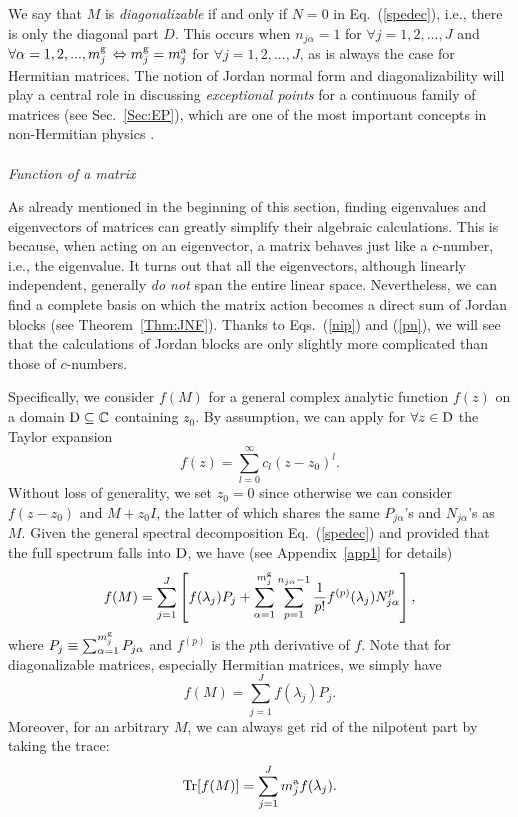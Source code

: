 \documentclass{tADP2e}
\theoremstyle{plain}
\theoremstyle{plain}
\theoremstyle{definition}
\begin{document}
We say that $M$ is \emph{diagonalizable} if and only if $N=0$ in Eq.~(\ref{spedec}), i.e., there is only the diagonal part $D$. This occurs when $n_{j\alpha}=1$ for $\forall j=1,2,...,J$ and $\forall\alpha=1,2,...,m^{\rm g}_j$ $\Leftrightarrow m^{\rm g}_j=m^{\rm a}_j$ for $\forall j=1,2,...,J$, as is always the case for Hermitian matrices. 
The notion of Jordan normal form and diagonalizability will play a central role in discussing \emph{exceptional points} \cite{TK80} for a continuous family of matrices (see Sec.~\ref{Sec:EP}), which are one of the most important concepts in non-Hermitian physics \cite{WDH12}. 
\\
\\
{\it Function of a matrix}

\vspace{3pt}
\noindent
As already mentioned in the beginning of this section, finding eigenvalues and eigenvectors of matrices can greatly simplify their algebraic calculations. This is because, when acting on an eigenvector, a matrix behaves just like a $c$-number, i.e., the eigenvalue. It turns out that all the eigenvectors, although linearly independent, generally \emph{do not} span the entire linear space. Nevertheless, we can find a complete basis on which the matrix action becomes a direct sum of Jordan blocks (see Theorem~\ref{Thm:JNF}). Thanks to Eqs.~(\ref{nip}) and (\ref{pn}), we will see that the calculations of Jordan blocks are only slightly more complicated than those of $c$-numbers.  

Specifically, we consider $f(M)$ for a general complex analytic function $f(z)$ on a domain ${\rm D}\subseteq\mathbb{C}$ containing $z_0$. By assumption, we can apply for $\forall z\in{\rm D}$ the Taylor expansion \cite{LVA79} 
\begin{equation}
f(z)=\sum^\infty_{l=0}c_l(z-z_0)^l. 
\end{equation}
Without loss of generality, we set $z_0=0$ since otherwise we can consider $f(z-z_0)$ and $M+z_0 I$, the latter of which shares the same $P_{j\alpha}$'s and $N_{j\alpha}$'s as $M$. Given the general spectral decomposition Eq.~(\ref{spedec}) and provided that the full spectrum falls into ${\rm D}$, we have (see Appendix~\ref{app1} for details)
\begin{equation}
f(M)=\sum^J_{j=1}\left[f(\lambda_j)P_j+\sum^{m^{\rm g}_j}_{\alpha=1}\sum^{n_{j\alpha}-1}_{p=1}\frac{1}{p!}f^{(p)}(\lambda_j)N_{j\alpha}^p\right],
\label{fM}
\end{equation}
where $P_j\equiv\sum^{m^{\rm g}_j}_{\alpha=1}P_{j\alpha}$ and $f^{(p)}$ is the $p$th derivative of $f$. Note that for diagonalizable matrices, especially Hermitian matrices, we simply have
\begin{equation}
f(M)=\sum^J_{j=1}f(\lambda_j)P_j.
\end{equation}
Moreover, for an arbitrary $M$, we can always get rid of the nilpotent part by taking the trace:
\begin{equation}
{\rm Tr}[f(M)]=\sum^J_{j=1}m^{\rm a}_j f(\lambda_j).
\end{equation}
\end{document}
